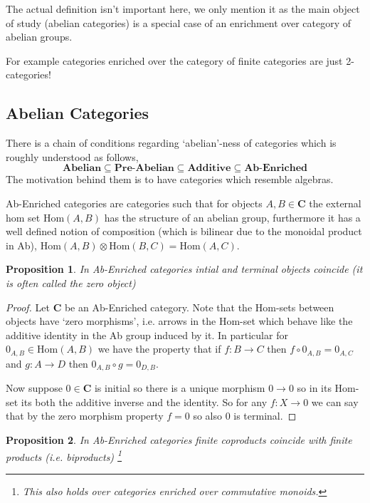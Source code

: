 \documentclass[12pt]{article}
\numberwithin{equation}{section}
\newcommand{\Hom}{{\mathrm{Hom}}}
\newtheorem{proposition}{Proposition}[section]
\begin{document}
	The actual definition isn't important here, we only mention it as the main object of study (abelian categories) is a special case of an enrichment over category of abelian groups.
	
	For example categories enriched over the category of finite categories are just 2-categories!
	\subsection{Abelian Categories}
	There is a chain of conditions regarding `abelian'-ness of categories which is roughly understood as follows,
	\[ \textbf{Abelian} \subseteq \textbf{Pre-Abelian} \subseteq \textbf{Additive} \subseteq \textbf{Ab-Enriched}\]
	The motivation behind them is to have categories which resemble algebras.
	
	Ab-Enriched categories are categories such that for objects $A,B \in \mathbf{C}$ the external hom set $\Hom(A,B)$ has the structure of an abelian group, furthermore it has a well defined notion of composition (which is bilinear due to the monoidal product in Ab), $\Hom(A,B)\otimes \Hom(B,C) =\Hom(A,C)$. 
	\begin{proposition}
		In Ab-Enriched categories intial and terminal objects coincide (it is often called the zero object)
	\end{proposition}
	\begin{proof}
		Let $\mathbf{C}$ be an Ab-Enriched category. Note that the Hom-sets between objects have `zero morphisms', i.e. arrows in the Hom-set which behave like the additive identity in the Ab group induced by it. In particular for $0_{A,B}\in \Hom(A,B)$ we have the property that if $f:B \to C$ then $f\circ 0_{A,B}=0_{A,C}$ and $g: A \to D$ then $0_{A,B}\circ g=0_{D,B}$.
		
		Now suppose $0 \in \mathbf{C}$ is initial so there is a unique morphism $0\to 0$ so in its Hom-set its both the additive inverse and the identity. So for any $f:X \to 0$ we can say that by the zero morphism property $f=0$ so also $0$ is terminal.
	\end{proof}
	\begin{proposition}
		In Ab-Enriched categories finite coproducts coincide with finite products (i.e. biproducts) \footnote{This also holds over categories enriched over commutative monoids.}
	\end{proposition}
\end{document}
